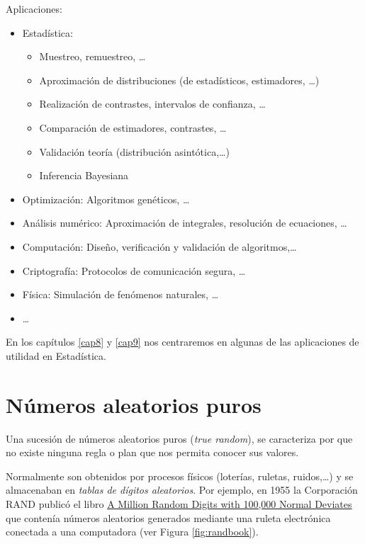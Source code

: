 \documentclass[
]{book}
\theoremstyle{break}
\theoremstyle{definition}
\theoremstyle{definition}
\theoremstyle{definition}
\theoremstyle{remark}
\begin{document}
Aplicaciones:

\begin{itemize}
\item
  Estadística:

  \begin{itemize}
  \item
    Muestreo, remuestreo, \ldots{}
  \item
    Aproximación de distribuciones (de estadísticos, estimadores, \ldots)
  \item
    Realización de contrastes, intervalos de confianza, \ldots{}
  \item
    Comparación de estimadores, contrastes, \ldots{}
  \item
    Validación teoría (distribución asintótica,\ldots)
  \item
    Inferencia Bayesiana
  \end{itemize}
\item
  Optimización: Algoritmos genéticos, \ldots{}
\item
  Análisis numérico: Aproximación de integrales, resolución de ecuaciones, \ldots{}
\item
  Computación: Diseño, verificación y validación de algoritmos,\ldots{}
\item
  Criptografía: Protocolos de comunicación segura, \ldots{}
\item
  Física: Simulación de fenómenos naturales, \ldots{}
\item
  \ldots{}
\end{itemize}

En los capítulos \ref{cap8} y \ref{cap9} nos centraremos en algunas de las aplicaciones de utilidad en Estadística.

\hypertarget{nuxfameros-aleatorios-puros}{%
\section{Números aleatorios puros}\label{nuxfameros-aleatorios-puros}}

Una sucesión de números aleatorios puros (\emph{true random}), se caracteriza por que no existe ninguna regla o plan que nos permita conocer sus valores.

Normalmente son obtenidos por procesos físicos
(loterías, ruletas, ruidos,\ldots) y se almacenaban en \emph{tablas de dígitos aleatorios}.
Por ejemplo, en 1955 la Corporación RAND publicó el libro \href{https://www.rand.org/pubs/monograph_reports/MR1418.html}{A Million Random Digits with 100,000 Normal Deviates} que contenía números aleatorios generados mediante una ruleta electrónica conectada a una computadora (ver Figura \ref{fig:randbook}).
\end{document}
